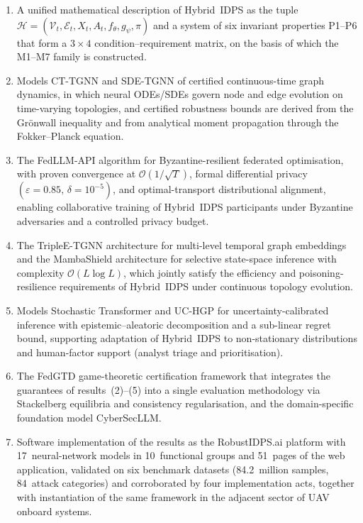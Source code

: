 \documentclass[12pt,a5paper]{article}
\begin{document}
\begin{enumerate}
\item A unified mathematical description of Hybrid~IDPS as
the tuple $\mathcal{H} = (\mathcal{V}_t, \mathcal{E}_t, X_t,
A_t, f_\theta, g_\psi, \pi)$ and a system of six invariant
properties P1--P6 that form a $3\times4$ condition--requirement
matrix, on the basis of which the M1--M7 family is constructed.

\item Models CT-TGNN and SDE-TGNN of certified continuous-time
graph dynamics, in which neural ODEs/SDEs govern node and edge
evolution on time-varying topologies, and certified robustness
bounds are derived from the Gr\"{o}nwall inequality and from
analytical moment propagation through the Fokker--Planck
equation.

\item The FedLLM-API algorithm for Byzantine-resilient
federated optimisation, with proven convergence at
$\mathcal{O}(1/\sqrt{T})$, formal differential privacy
$(\varepsilon{=}0.85,\,\delta{=}10^{-5})$, and optimal-transport
distributional alignment, enabling collaborative training of
Hybrid~IDPS participants under Byzantine adversaries and a
controlled privacy budget.

\item The TripleE-TGNN architecture for multi-level temporal
graph embeddings and the MambaShield architecture for selective
state-space inference with complexity $\mathcal{O}(L\log L)$,
which jointly satisfy the efficiency and poisoning-resilience
requirements of Hybrid~IDPS under continuous topology
evolution.

\item Models Stochastic Transformer and UC-HGP for
uncertainty-calibrated inference with epistemic--aleatoric
decomposition and a sub-linear regret bound, supporting
adaptation of Hybrid~IDPS to non-stationary distributions and
human-factor support (analyst triage and prioritisation).

\item The FedGTD game-theoretic certification framework that
integrates the guarantees of results~(2)--(5) into a single
evaluation methodology via Stackelberg equilibria and
consistency regularisation, and the domain-specific foundation
model CyberSecLLM.

\item Software implementation of the results as the
RobustIDPS.ai platform with 17~neural-network models in
10~functional groups and 51~pages of the web application,
validated on six benchmark datasets (84.2~million samples,
84~attack categories) and corroborated by four implementation
acts, together with instantiation of the same framework in the
adjacent sector of UAV onboard systems.
\end{enumerate}
\end{document}
